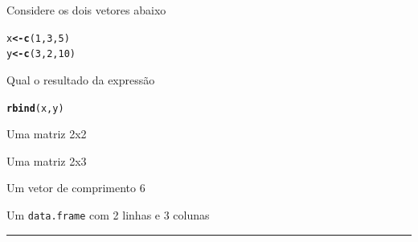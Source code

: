 \documentclass[a4paper,11pt,fleqn]{article}\usepackage[]{graphicx}\usepackage[]{color}
\makeatletter
\newcommand{\hlnum}[1]{\textcolor[rgb]{0,0,0}{#1}}%
\newcommand{\hlstd}[1]{\textcolor[rgb]{0,0,0}{#1}}%
\newcommand{\hlkwb}[1]{\textcolor[rgb]{0,0,0}{\textbf{#1}}}%
\newcommand{\hlkwd}[1]{\textcolor[rgb]{0,0,0}{\textbf{#1}}}%
\newenvironment{kframe}{%
 \def\at@end@of@kframe{}%
 \ifinner\ifhmode%
  \def\at@end@of@kframe{\end{minipage}}%
  \begin{minipage}{\columnwidth}%
 \fi\fi%
 \def\FrameCommand##1{\hskip\@totalleftmargin \hskip-\fboxsep
 \colorbox{shadecolor}{##1}\hskip-\fboxsep
     \hskip-\linewidth \hskip-\@totalleftmargin \hskip\columnwidth}%
 \MakeFramed {\advance\hsize-\width
   \@totalleftmargin\z@ \linewidth\hsize
   \@setminipage}}%
 {\par\unskip\endMakeFramed%
 \at@end@of@kframe}
\newenvironment{knitrout}{}{} %
\theoremstyle{definition}
\makeatother
\begin{document}
\begin{compactenum}[5.]
\item Considere os dois vetores abaixo
\begin{knitrout}\small
{}\color{fgcolor}\begin{kframe}
\begin{alltt}
\hlstd{x} \hlkwb{<-} \hlkwd{c}\hlstd{(}\hlnum{1}\hlstd{,} \hlnum{3}\hlstd{,} \hlnum{5}\hlstd{)}
\hlstd{y} \hlkwb{<-} \hlkwd{c}\hlstd{(}\hlnum{3}\hlstd{,} \hlnum{2}\hlstd{,} \hlnum{10}\hlstd{)}
\end{alltt}
\end{kframe}
\end{knitrout}
Qual o resultado da expressão
\begin{knitrout}\small
{}\color{fgcolor}\begin{kframe}
\begin{alltt}
\hlkwd{rbind}\hlstd{(x, y)}
\end{alltt}
\end{kframe}
\end{knitrout}
\begin{compactenum}
  \item Uma matriz 2x2
  \item Uma matriz 2x3
  \item Um vetor de comprimento 6
  \item Um \texttt{data.frame} com 2 linhas e 3 colunas
\end{compactenum}

\end{compactenum}

\vspace{0.3cm}
\hrule
\vspace{0.3cm}
\end{document}
